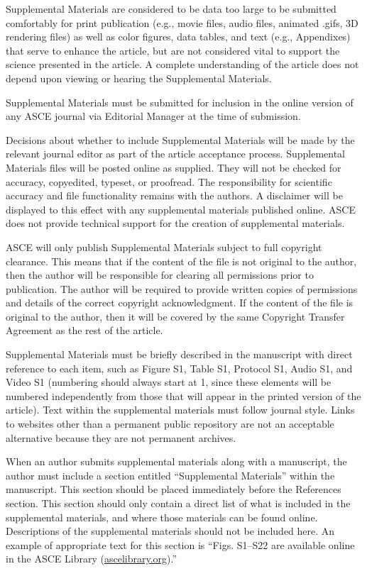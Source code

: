 \documentclass[NewProceedings,letterpaper]{ascelike-new}
\begin{document}
Supplemental Materials are considered to be data too large to be submitted comfortably for print publication (e.g., movie files, audio files, animated .gifs, 3D rendering files) as well as color figures, data tables, and text (e.g., Appendixes) that serve to enhance the article, but are not considered vital to support the science presented in the article. A complete understanding of the article does not depend upon viewing or hearing the Supplemental Materials.

Supplemental Materials must be submitted for inclusion in the online version of any ASCE journal via Editorial Manager at the time of submission.

Decisions about whether to include Supplemental Materials will be made by the relevant journal editor as part of the article acceptance process. Supplemental Materials files will be posted online as supplied. They will not be checked for accuracy, copyedited, typeset, or proofread. The responsibility for scientific accuracy and file functionality remains with the authors. A disclaimer will be displayed to this effect with any supplemental materials published online. ASCE does not provide technical support for the creation of supplemental materials.

ASCE will only publish Supplemental Materials subject to full copyright clearance. This means that if the content of the file is not original to the author, then the author will be responsible for clearing all permissions prior to publication. The author will be required to provide written copies of permissions and details of the correct copyright acknowledgment. If the content of the file is original to the author, then it will be covered by the same Copyright Transfer Agreement as the rest of the article.

Supplemental Materials must be briefly described in the manuscript with direct reference to each item, such as Figure S1, Table S1, Protocol S1, Audio S1, and Video S1 (numbering should always start at 1, since these elements will be numbered independently from those that will appear in the printed version of the article). Text within the supplemental materials must follow journal style. Links to websites other than a permanent public repository are not an acceptable alternative because they are not permanent archives.

When an author submits supplemental materials along with a manuscript, the author must include a section entitled ``Supplemental Materials'' within the manuscript. This section should be placed immediately before the References section. This section should only contain a direct list of what is included in the supplemental materials, and where those materials can be found online. Descriptions of the supplemental materials should not be included here. An example of appropriate text for this section is ``Figs. S1–S22 are available online in the ASCE Library (\href{http://ascelibrary.org/}{ascelibrary.org}).''
\end{document}

